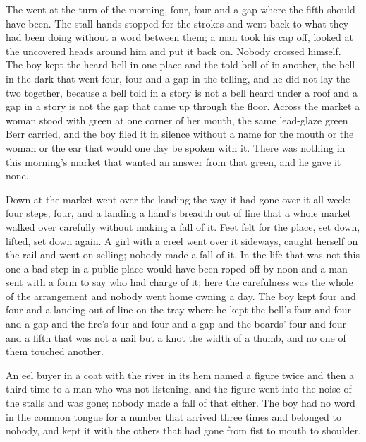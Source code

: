 The  went at the turn of the morning, four, four and a gap where the fifth should have been. The stall-hands stopped for the strokes and went back to what they had been doing without a word between them; a man took his cap off, looked at the uncovered heads around him and put it back on. Nobody crossed himself. The boy kept the heard bell in one place and the told bell of  in another, the bell in the dark that went four, four and a gap in the telling, and he did not lay the two together, because a bell told in a story is not a bell heard under a roof and a gap in a story is not the gap that came up through the floor. Across the market a woman stood with green at one corner of her mouth, the same lead-glaze green Berr carried, and the boy filed it in silence without a name for the mouth or the woman or the ear that would one day be spoken with it. There was nothing in this morning's market that wanted an answer from that green, and he gave it none.

\scenebreak

Down at  the market went over the landing the way it had gone over it all week: four steps, four, and a landing a hand's breadth out of line that a whole market walked over carefully without making a fall of it. Feet felt for the place, set down, lifted, set down again. A girl with a creel went over it sideways, caught herself on the rail and went on selling; nobody made a fall of it. In the life that was not this one a bad step in a public place would have been roped off by noon and a man sent with a form to say who had charge of it; here the carefulness was the whole of the arrangement and nobody went home owning a day. The boy kept four and four and a landing out of line on the tray where he kept the bell's four and four and a gap and the fire's four and four and a gap and the boards' four and four and a fifth that was not a nail but a knot the width of a thumb, and no one of them touched another.

An eel buyer in a coat with the river in its hem named a figure twice and then a third time to a man who was not listening, and the figure went into the noise of the stalls and was gone; nobody made a fall of that either. The boy had no word in the common tongue for a number that arrived three times and belonged to nobody, and kept it with the others that had gone from fist to mouth to shoulder.

